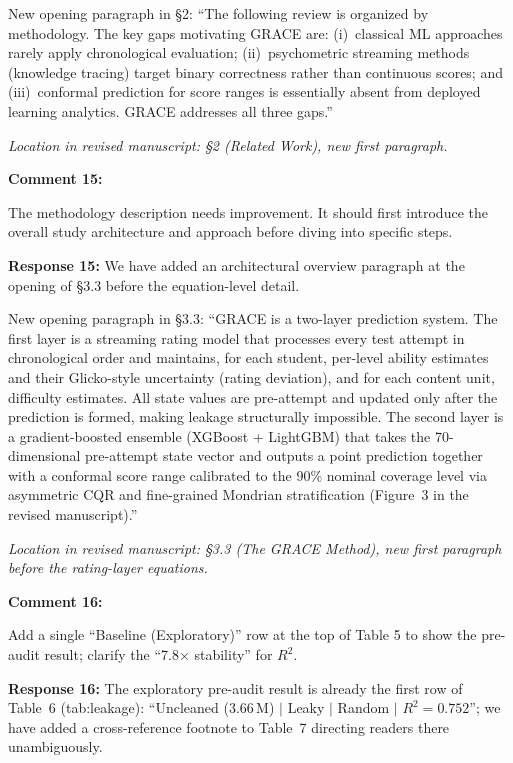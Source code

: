 \documentclass[11pt]{article}
\newcommand{\rev}[1]{{\color{ccolor}#1}}
\begin{document}
\rev{New opening paragraph in \S2: ``The following review is organized by methodology.
The key gaps motivating GRACE are: (i)~classical ML approaches rarely apply
chronological evaluation; (ii)~psychometric streaming methods (knowledge tracing)
target binary correctness rather than continuous scores; and (iii)~conformal prediction
for score ranges is essentially absent from deployed learning analytics. GRACE addresses
all three gaps.''}

\textit{Location in revised manuscript: \S2 (Related Work), new first paragraph.}

\bigskip

\textbf{Comment 15:}
\begin{rquote}
The methodology description needs improvement. It should first introduce the overall
study architecture and approach before diving into specific steps.
\end{rquote}

\textbf{Response 15:}
We have added an architectural overview paragraph at the opening of \S3.3
before the equation-level detail.

\rev{New opening paragraph in \S3.3: ``GRACE is a two-layer prediction system. The
first layer is a streaming rating model that processes every test attempt in
chronological order and maintains, for each student, per-level ability estimates and
their Glicko-style uncertainty (rating deviation), and for each content unit, difficulty
estimates. All state values are pre-attempt and updated only after the prediction is
formed, making leakage structurally impossible. The second layer is a gradient-boosted
ensemble (XGBoost + LightGBM) that takes the 70-dimensional pre-attempt state vector
and outputs a point prediction together with a conformal score range calibrated to the
90\% nominal coverage level via asymmetric CQR and fine-grained Mondrian stratification
(Figure~3 in the revised manuscript).''}

\textit{Location in revised manuscript: \S3.3 (The GRACE Method), new first
paragraph before the rating-layer equations.}

\bigskip

\textbf{Comment 16:}
\begin{rquote}
Add a single ``Baseline (Exploratory)'' row at the top of Table 5 to show the
pre-audit result; clarify the ``7.8$\times$ stability'' for $R^2$.
\end{rquote}

\textbf{Response 16:}
The exploratory pre-audit result is already the first row of Table~6 (tab:leakage):
``Uncleaned (3.66\,M) $|$ Leaky $|$ Random $|$ $R^2 = 0.752$''; we have added a
cross-reference footnote to Table~7 directing readers there unambiguously.
\end{document}
